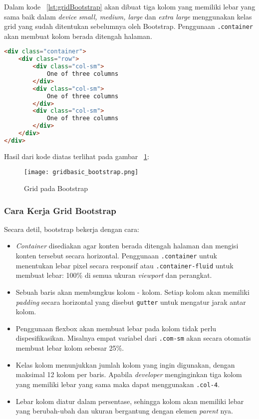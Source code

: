 \noindent Dalam kode ~\ref{lst:gridBootstrap} akan dibuat tiga kolom yang memiliki lebar yang sama baik dalam \textit{device} \textit{small, medium, large} dan \textit{extra large} menggunakan kelas grid yang sudah ditentukan sebelumnya oleh Bootstrap. Penggunaan \verb|.container| akan membuat kolom berada ditengah halaman.
\begin{lstlisting}[style=customhtml, language=HTML,  basicstyle=\ttfamily, frame=single, columns=fullflexible, keepspaces=true, breaklines=true, showstringspaces=false, label={lst:gridBootstrap}, caption=Sistem grid pada bootstrap 4] 
<div class="container">
	<div class="row">
		<div class="col-sm">
			One of three columns
		</div>
		<div class="col-sm">
			One of three columns
		</div>
		<div class="col-sm">
			One of three columns
		</div>
	</div>
</div>
\end{lstlisting}
\noindent Hasil dari kode diatas terlihat pada gambar ~\ref{fig:gridBootstrap}:
\begin{figure} [H]
	\centering  
	\texttt{[image: gridbasic\_bootstrap.png]}  
	\caption{Grid pada Bootstrap} 
	\label{fig:gridBootstrap}
\end{figure}

\subsubsection{Cara Kerja Grid Bootstrap}
\noindent Secara detil, bootstrap bekerja dengan cara:
\begin{itemize}
	\item \textit{Container} disediakan agar konten berada ditengah halaman dan mengisi konten tersebut secara horizontal. Penggunaan \verb|.container| untuk menentukan lebar pixel secara responsif atau \verb|.container-fluid| untuk membuat lebar: 100\%  di semua ukuran \textit{viewport} dan perangkat.
	\item Sebuah baris akan membungkus kolom - kolom. Setiap kolom akan memiliki \textit{padding} secara horizontal yang disebut \verb|gutter| untuk mengatur jarak antar kolom.
	\item Penggunaan flexbox akan membuat lebar pada kolom tidak perlu dispesifikasikan. Misalnya empat variabel dari \verb|.com-sm| akan secara otomatis membuat lebar kolom sebesar 25\%.
	\item Kelas kolom menunjukkan jumlah kolom yang ingin digunakan, dengan maksimal 12 kolom per baris. Apabila \textit{developer} menginginkan tiga kolom yang memiliki lebar yang sama maka dapat menggunakan \texttt{.col-4}.
	\item Lebar kolom diatur dalam persentase, sehingga kolom akan memiliki lebar yang berubah-ubah dan ukuran bergantung dengan elemen \textit{parent} nya.
\end{itemize}

